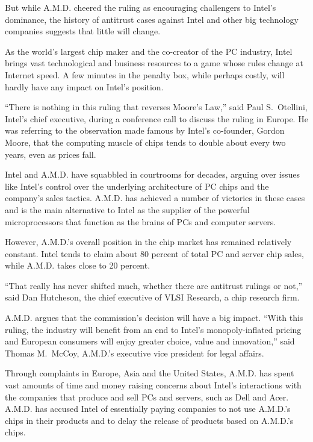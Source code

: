 \documentclass[12pt,a4paper,onecolumn]{article}
\begin{document}
But while A.M.D. cheered the ruling as encouraging challengers to Intel's dominance, the history of
antitrust cases against Intel and other big technology companies suggests that little will change.

As the world's largest chip maker and the co-creator of the PC industry, Intel brings vast
technological and business resources to a game whose rules change at Internet speed. A few minutes
in the penalty box, while perhaps costly, will hardly have any impact on Intel's position.

``There is nothing in this ruling that reverses Moore's Law,'' said Paul S.~Otellini, Intel's chief
executive, during a conference call to discuss the ruling in Europe. He was referring to the
observation made famous by Intel's co-founder, Gordon Moore, that the computing muscle of chips
tends to double about every two years, even as prices fall.

Intel and A.M.D. have squabbled in courtrooms for decades, arguing over issues like Intel's control
over the underlying architecture of PC chips and the company's sales tactics. A.M.D. has achieved a
number of victories in these cases and is the main alternative to Intel as the supplier of the
powerful microprocessors that function as the brains of PCs and computer servers.

However, A.M.D.'s overall position in the chip market has remained relatively constant. Intel tends
to claim about 80 percent of total PC and server chip sales, while A.M.D. takes close to 20 percent.

``That really has never shifted much, whether there are antitrust rulings or not,'' said Dan
Hutcheson, the chief executive of VLSI Research, a chip research firm.

A.M.D. argues that the commission's decision will have a big impact. ``With this ruling, the
industry will benefit from an end to Intel's monopoly-inflated pricing and European consumers will
enjoy greater choice, value and innovation,'' said Thomas M.~McCoy, A.M.D.'s executive vice
president for legal affairs.

Through complaints in Europe, Asia and the United States, A.M.D. has spent vast amounts of time and
money raising concerns about Intel's interactions with the companies that produce and sell PCs and
servers, such as Dell and Acer. A.M.D. has accused Intel of essentially paying companies to not use
A.M.D.'s chips in their products and to delay the release of products based on A.M.D.'s chips.
\end{document}
